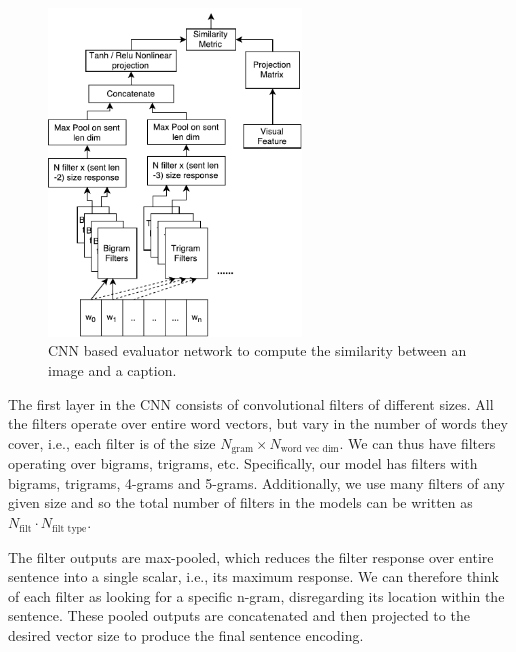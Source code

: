 
\begin{figure}[t] 
  \centering
  \includegraphics[width=0.6\textwidth]{./images/CnnEval.pdf} 
  \caption{CNN based evaluator network to compute the similarity between 
    an image and a caption.}
  \label{fig:CNNEval} 
\end{figure}


The first layer in the CNN consists of convolutional filters of different sizes.  
All the filters operate over entire word vectors, but vary in the number of
words they cover, i.e., each filter is of the size $N_{\text{gram}} \times
N_{\text{word vec dim}}$. 
We can thus have filters operating over bigrams, trigrams, etc.
Specifically, our model has filters with bigrams, trigrams, 4-grams and 5-grams. 
Additionally, we use many filters of any given size and so the total number of
filters in the models can be written as $N_{\text{filt}} \cdot N_{\text{filt
type}}$.

The filter outputs are max-pooled, which reduces the filter response over entire
sentence into a single scalar, i.e., its maximum response. 
We can therefore think of each filter as looking for a specific n-gram,
disregarding its location within the sentence.
These pooled outputs are concatenated and then projected to the desired vector
size to produce the final sentence encoding.

